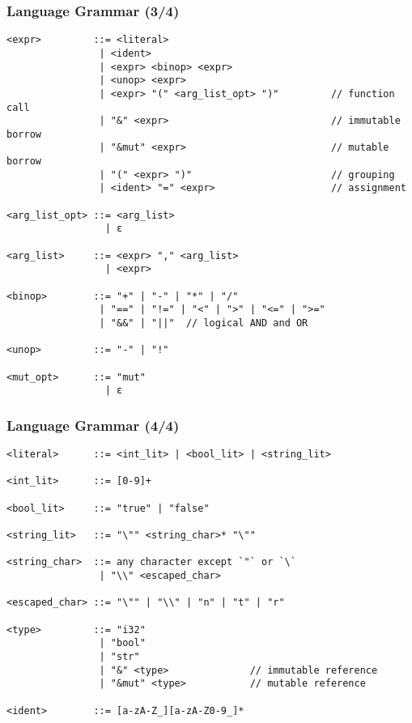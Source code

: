 \documentclass{beamer}
\begin{document}
\begin{frame}[fragile]
\frametitle{Language Grammar (3/4)}
\begin{lstlisting}[language=bnf,basicstyle=\tiny]
<expr>         ::= <literal>
                | <ident>
                | <expr> <binop> <expr>
                | <unop> <expr>
                | <expr> "(" <arg_list_opt> ")"         // function call
                | "&" <expr>                            // immutable borrow
                | "&mut" <expr>                         // mutable borrow
                | "(" <expr> ")"                        // grouping
                | <ident> "=" <expr>                    // assignment

<arg_list_opt> ::= <arg_list>
                 | ε

<arg_list>     ::= <expr> "," <arg_list>
                 | <expr>

<binop>        ::= "+" | "-" | "*" | "/" 
                | "==" | "!=" | "<" | ">" | "<=" | ">="
                | "&&" | "||"  // logical AND and OR

<unop>         ::= "-" | "!"

<mut_opt>      ::= "mut"
                 | ε
\end{lstlisting}
\end{frame}

\begin{frame}[fragile]
\frametitle{Language Grammar (4/4)}
\begin{lstlisting}[language=bnf,basicstyle=\tiny]
<literal>      ::= <int_lit> | <bool_lit> | <string_lit>

<int_lit>      ::= [0-9]+

<bool_lit>     ::= "true" | "false"

<string_lit>   ::= "\"" <string_char>* "\""

<string_char>  ::= any character except `"` or `\`
                | "\\" <escaped_char>

<escaped_char> ::= "\"" | "\\" | "n" | "t" | "r"

<type>         ::= "i32"
                | "bool"
                | "str"
                | "&" <type>              // immutable reference
                | "&mut" <type>           // mutable reference

<ident>        ::= [a-zA-Z_][a-zA-Z0-9_]*
\end{lstlisting}
\end{frame}
\end{document}
